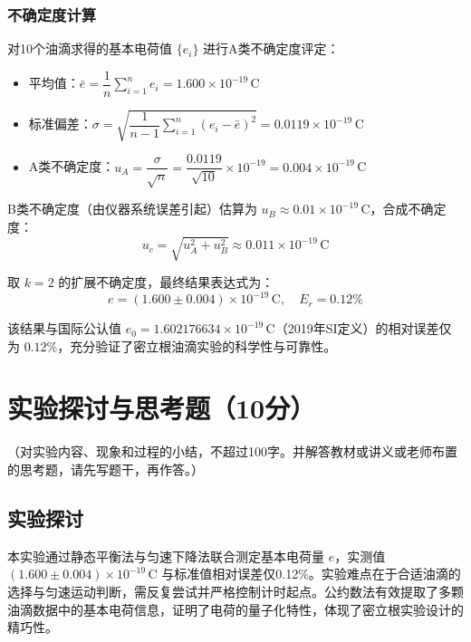 \documentclass{Phyport}
\begin{document}
\subsubsection{不确定度计算}

对10个油滴求得的基本电荷值 $\{e_i\}$ 进行A类不确定度评定：

\begin{itemize}
    \item 平均值：$\bar{e} = \dfrac{1}{n}\sum_{i=1}^{n} e_i = 1.600 \times 10^{-19}$\,C
    \item 标准偏差：$\sigma = \sqrt{\dfrac{1}{n-1}\sum_{i=1}^{n}(e_i - \bar{e})^2} = 0.0119 \times 10^{-19}$\,C
    \item A类不确定度：$u_A = \dfrac{\sigma}{\sqrt{n}} = \dfrac{0.0119}{\sqrt{10}} \times 10^{-19} = 0.004 \times 10^{-19}$\,C
\end{itemize}

B类不确定度（由仪器系统误差引起）估算为 $u_B \approx 0.01 \times 10^{-19}$\,C，合成不确定度：
\begin{equation}
    u_c = \sqrt{u_A^2 + u_B^2} \approx 0.011 \times 10^{-19}\,\mathrm{C}
\end{equation}

取 $k = 2$ 的扩展不确定度，最终结果表达式为：
\begin{equation}
    \boxed{e = (1.600 \pm 0.004) \times 10^{-19}\,\mathrm{C}, \quad E_r = 0.12\%}
\end{equation}

该结果与国际公认值 $e_0 = 1.602176634 \times 10^{-19}$\,C（2019年SI定义）的相对误差仅为 $0.12\%$，充分验证了密立根油滴实验的科学性与可靠性。

\section{实验探讨与思考题（10分）}
（对实验内容、现象和过程的小结，不超过100字。并解答教材或讲义或老师布置的思考题，请先写题干，再作答。）

\subsection{实验探讨}

本实验通过静态平衡法与匀速下降法联合测定基本电荷量 $e$，实测值 $(1.600 \pm 0.004) \times 10^{-19}$\,C 与标准值相对误差仅0.12\%。实验难点在于合适油滴的选择与匀速运动判断，需反复尝试并严格控制计时起点。公约数法有效提取了多颗油滴数据中的基本电荷信息，证明了电荷的量子化特性，体现了密立根实验设计的精巧性。
\end{document}
